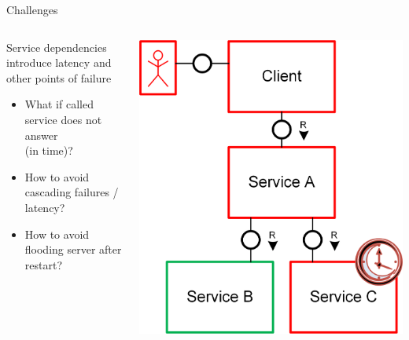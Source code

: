 \begin{frame}{Challenges}
\begin{columns}[T] 
\begin{column}{.67\textwidth}
Service dependencies introduce latency and other points of failure
\begin{itemize}
	\item What if called service does not answer \\(in time)?
	\item How to avoid cascading failures / latency?
	\item How to avoid flooding server after restart?
 \end{itemize}
\end{column}
\hfill
\begin{column}{.29\textwidth}
\centerline{\includegraphics[width=\textwidth]{../Service2ServiceCommunication/images/CascadingIssue}}
\end{column}
\end{columns}

\vfill
{}
\end{frame}

